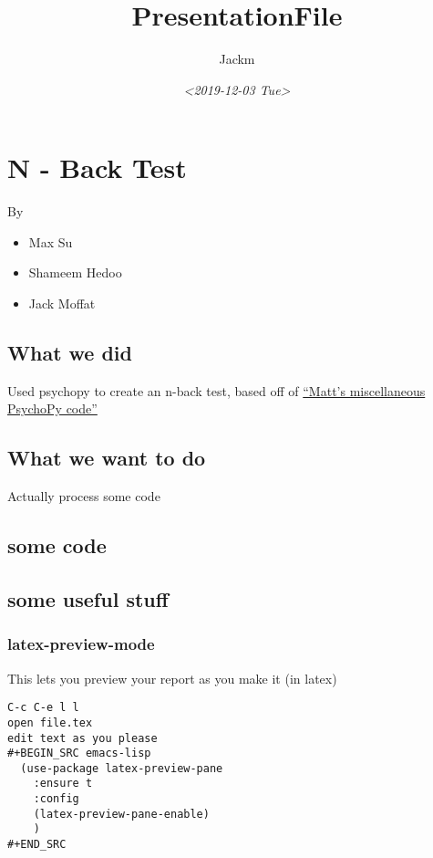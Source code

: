 \documentclass[11pt]{article}
\author{Jackm}
\date{\textit{<2019-12-03 Tue>}}
\title{PresentationFile}
\begin{document}
\maketitle





\section{N - Back Test}
\label{sec:orgb963a8b}
By
\begin{itemize}
\item Max Su
\item Shameem Hedoo
\item Jack Moffat
\end{itemize}


\subsection{What we did}
\label{sec:orgd1169a0}
Used psychopy to create an n-back test, based off of \href{https://osf.io/ewu5m/}{``Matt's miscellaneous PsychoPy code''}



\subsection{What we want to do}
\label{sec:org301a888}
Actually process some code

\subsection{some code}
\label{sec:org2969eab}




\subsection{some useful stuff}
\label{sec:org194905f}

\subsubsection{latex-preview-mode}
\label{sec:orgee49f9b}
This lets you preview your report as you make it (in latex)

\begin{verbatim}
C-c C-e l l
open file.tex
edit text as you please
#+BEGIN_SRC emacs-lisp
  (use-package latex-preview-pane
    :ensure t
    :config
    (latex-preview-pane-enable)
    )
#+END_SRC

\end{verbatim}
\end{document}
